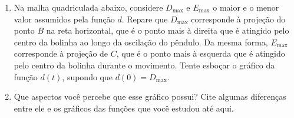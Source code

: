 \documentclass[10 pt,usenames,dvipsnames, oneside]{article}
\begin{document}
\ifdefined\prof
\clearpage
\else\fi
\begin{enumerate}
\item Na malha quadriculada abaixo, considere $D_{\max}$ e $E_{\max}$ o maior e o menor valor assumidos pela função $d$. Repare que $D_{\max}$ corresponde à projeção do ponto $B$ na reta horizontal, que é o ponto mais à direita que é atingido pelo centro da bolinha ao longo da oscilação do pêndulo. Da mesma forma, $E_{\max}$ corresponde à projeção de $C$, que é o ponto mais à esquerda que é atingido pelo centro da bolinha durante o movimento. Tente esboçar o gráfico da função $d(t)$, supondo que $d(0) = D_{\max}$.

\begin{figure}[H]
\centering

\resizebox{.75\linewidth}{!}
{
}
\end{figure}

\item Que aspectos você percebe que esse gráfico possui? Cite algumas diferenças entre ele e os gráficos das funções que você estudou até aqui.
\end{enumerate}




\end{document}
